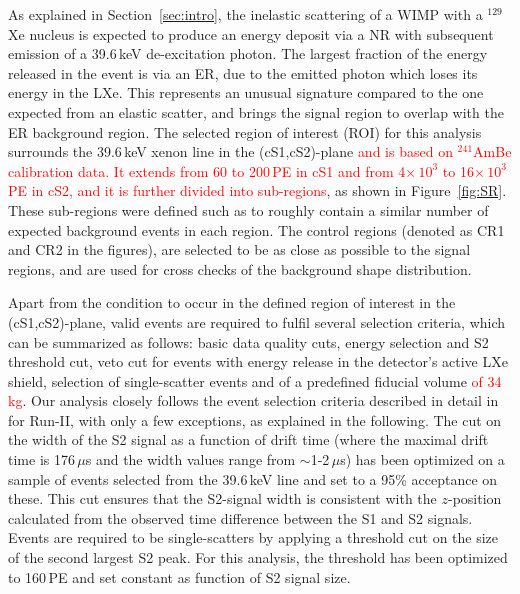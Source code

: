 As explained in Section~\ref{sec:intro}, the inelastic scattering of a WIMP with a $^{129}$Xe nucleus is expected to produce an energy deposit via a NR with subsequent emission of  
a 39.6\,keV de-excitation photon. The largest fraction of the energy released in the event is via an ER, due to the emitted photon which loses its energy in the LXe.
This represents an unusual signature compared to the one expected from an elastic scatter, and brings the signal region to overlap with the ER background region.
The selected region of interest (ROI) for this analysis surrounds the 39.6\,keV xenon line in the (cS1,cS2)-plane 
\textcolor{red} {and is based on $^{241}$AmBe calibration data. It extends from 60 to 200\,PE in cS1 and from 4$\times \, 10^3$ to 16$\times \, 10^3$\,PE in cS2, and it is further divided  into sub-regions}, as shown 
in Figure~\ref{fig:SR}.  These sub-regions were defined such as to roughly contain a similar number of expected background events in each region. The control regions (denoted as CR1 and CR2 in the figures), are selected to be as close as possible to the signal regions,  and are used for cross checks of the background shape distribution.

Apart from the condition to occur in the defined region of interest in the (cS1,cS2)-plane, valid events are required to fulfil several selection criteria, 
which can be summarized as follows: basic data quality cuts, energy selection and S2 threshold cut, veto cut for events with energy release in the detector's active LXe shield, 
selection of single-scatter events and of a predefined fiducial volume 
\textcolor{red}{of 34\,kg}.  
Our analysis closely follows the event selection criteria described in detail in \cite{Aprile:2012vw} for Run-II, with only a few exceptions, as explained in the following. 
The cut on the width of the S2 signal as a function of drift time (where the maximal drift time is 176\,$\mu$s and the width values range from $\sim$1-2\,$\mu$s) has been optimized on a sample of events selected from the 39.6\,keV line and set to a 95\% acceptance on these. This cut ensures that the S2-signal width is consistent with the $z$-position calculated from the observed time difference between the S1 and S2 signals. Events are required to be single-scatters by applying a threshold cut on the size of the 
second largest S2 peak. For this analysis, the threshold has been optimized to 160\,PE and set constant as function of S2 signal size. 


